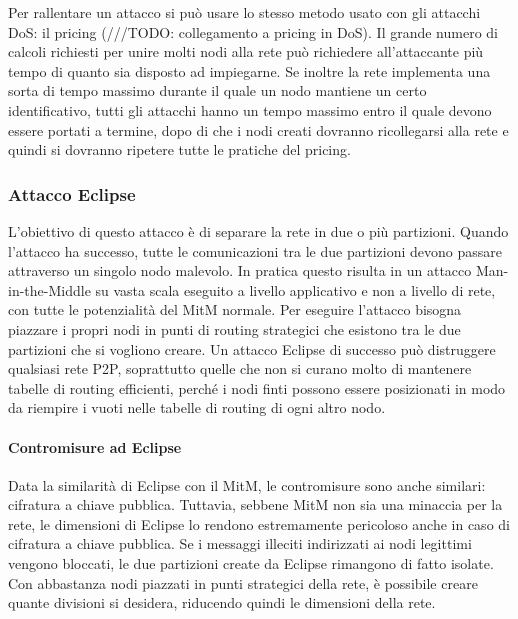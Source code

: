 Per rallentare un attacco si può usare lo stesso metodo usato con gli
attacchi DoS: il pricing (///TODO: collegamento a pricing in DoS). Il
grande numero di calcoli richiesti per unire molti nodi alla rete può
richiedere all'attaccante più tempo di quanto sia disposto ad
impiegarne. Se inoltre la rete implementa una sorta di tempo massimo
durante il quale un nodo mantiene un certo identificativo, tutti gli
attacchi hanno un tempo massimo entro il quale devono essere portati a
termine, dopo di che i nodi creati dovranno ricollegarsi alla rete e
quindi si dovranno ripetere tutte le pratiche del pricing.

\subsubsection{Attacco Eclipse}\label{attacco-eclipse}

L'obiettivo di questo attacco è di separare la rete in due o più
partizioni. Quando l'attacco ha successo, tutte le comunicazioni tra le
due partizioni devono passare attraverso un singolo nodo malevolo. In
pratica questo risulta in un attacco Man-in-the-Middle su vasta scala
eseguito a livello applicativo e non a livello di rete, con tutte le
potenzialità del MitM normale. Per eseguire l'attacco bisogna piazzare i
propri nodi in punti di routing strategici che esistono tra le due
partizioni che si vogliono creare. Un attacco Eclipse di successo può
distruggere qualsiasi rete P2P, soprattutto quelle che non si curano
molto di mantenere tabelle di routing efficienti, perché i nodi finti
possono essere posizionati in modo da riempire i vuoti nelle tabelle di
routing di ogni altro nodo.

\paragraph{Contromisure ad Eclipse}\label{contromisure-ad-eclipse}

Data la similarità di Eclipse con il MitM, le contromisure sono anche
similari: cifratura a chiave pubblica. Tuttavia, sebbene MitM non sia
una minaccia per la rete, le dimensioni di Eclipse lo rendono
estremamente pericoloso anche in caso di cifratura a chiave pubblica. Se
i messaggi illeciti indirizzati ai nodi legittimi vengono bloccati, le
due partizioni create da Eclipse rimangono di fatto isolate. Con
abbastanza nodi piazzati in punti strategici della rete, è possibile
creare quante divisioni si desidera, riducendo quindi le dimensioni
della rete.

